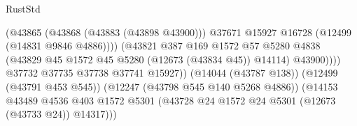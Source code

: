 \begin{lexlean}{RustStd}
\begin{coremodule}
{\begin{coremodule}
{{{{{{{{{{{{{{{{{{{{{{{{{{{{{{{{{{{{{{{{{{{{{{{{{{{{{{{{{{{{{{{{{{{{{{{{{{{{{{{{                                                        (@43865
                                                          (@43868 (@43883 (@43898 @43900)))
                                                          @37671
                                                          @15927
                                                          @16728
                                                          (@12499 (@14831 @9846 @4886))))
                                                      (@43821
                                                        @387
                                                        @169
                                                        @1572
                                                        @57
                                                        @5280
                                                        @4838
                                                        (@43829
                                                          @45
                                                          @1572
                                                          @45
                                                          @5280
                                                          (@12673 (@43834 @45))
                                                          @14114)
                                                        @43900))))
                                                @37732
                                                @37735
                                                @37738
                                                @37741
                                                @15927))
                                            (@14044 (@43787 @138))
                                            (@12499 (@43791 @453 @545))
                                            (@12247 (@43798 @545 @140 @5268 @4886))
                                            (@14153
                                              @43489
                                              @4536
                                              @403
                                              @1572
                                              @5301
                                              (@43728
                                                @24
                                                @1572
                                                @24
                                                @5301
                                                (@12673 (@43733 @24))
                                                @14317)))
}}}}}}}}}}}}}}}}}}}}}}}}}}}}}}}}}}}}}}}}}}}}}}}}}}}}}}}}}}}}}}}}}}}}}}}}}}}}}}}}
\end{coremodule}}
\end{coremodule}
\end{lexlean}
